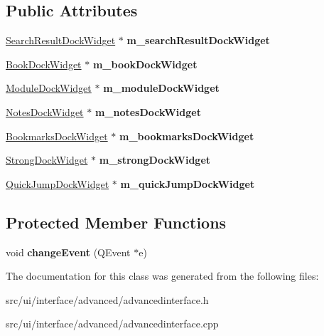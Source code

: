 \subsection*{Public Attributes}
\begin{DoxyCompactItemize}
\item 
\hypertarget{classAdvancedInterface_a4ee1863e0fc85681672d0b10ea0c6beb}{
\hyperlink{classSearchResultDockWidget}{SearchResultDockWidget} $\ast$ {\bfseries m\_\-searchResultDockWidget}}
\label{classAdvancedInterface_a4ee1863e0fc85681672d0b10ea0c6beb}

\item 
\hypertarget{classAdvancedInterface_a33add43a6acc8ff3f9a08caa7dbc9460}{
\hyperlink{classBookDockWidget}{BookDockWidget} $\ast$ {\bfseries m\_\-bookDockWidget}}
\label{classAdvancedInterface_a33add43a6acc8ff3f9a08caa7dbc9460}

\item 
\hypertarget{classAdvancedInterface_a119c7eb9abd50df360ea0541ca8f43eb}{
\hyperlink{classModuleDockWidget}{ModuleDockWidget} $\ast$ {\bfseries m\_\-moduleDockWidget}}
\label{classAdvancedInterface_a119c7eb9abd50df360ea0541ca8f43eb}

\item 
\hypertarget{classAdvancedInterface_abfb53c28e79f7ff448d810655a869cf4}{
\hyperlink{classNotesDockWidget}{NotesDockWidget} $\ast$ {\bfseries m\_\-notesDockWidget}}
\label{classAdvancedInterface_abfb53c28e79f7ff448d810655a869cf4}

\item 
\hypertarget{classAdvancedInterface_a429d87246f3c4799e373e4f7ee430df4}{
\hyperlink{classBookmarksDockWidget}{BookmarksDockWidget} $\ast$ {\bfseries m\_\-bookmarksDockWidget}}
\label{classAdvancedInterface_a429d87246f3c4799e373e4f7ee430df4}

\item 
\hypertarget{classAdvancedInterface_ac81be7cae8ef721432d9412fae3becdd}{
\hyperlink{classStrongDockWidget}{StrongDockWidget} $\ast$ {\bfseries m\_\-strongDockWidget}}
\label{classAdvancedInterface_ac81be7cae8ef721432d9412fae3becdd}

\item 
\hypertarget{classAdvancedInterface_a91c4d538941225fa7c624f2eb864d4a4}{
\hyperlink{classQuickJumpDockWidget}{QuickJumpDockWidget} $\ast$ {\bfseries m\_\-quickJumpDockWidget}}
\label{classAdvancedInterface_a91c4d538941225fa7c624f2eb864d4a4}

\end{DoxyCompactItemize}
\subsection*{Protected Member Functions}
\begin{DoxyCompactItemize}
\item 
\hypertarget{classAdvancedInterface_ae6a50f86aa4d8657951aa406110a2ca5}{
void {\bfseries changeEvent} (QEvent $\ast$e)}
\label{classAdvancedInterface_ae6a50f86aa4d8657951aa406110a2ca5}

\end{DoxyCompactItemize}


The documentation for this class was generated from the following files:\begin{DoxyCompactItemize}
\item 
src/ui/interface/advanced/advancedinterface.h\item 
src/ui/interface/advanced/advancedinterface.cpp\end{DoxyCompactItemize}
